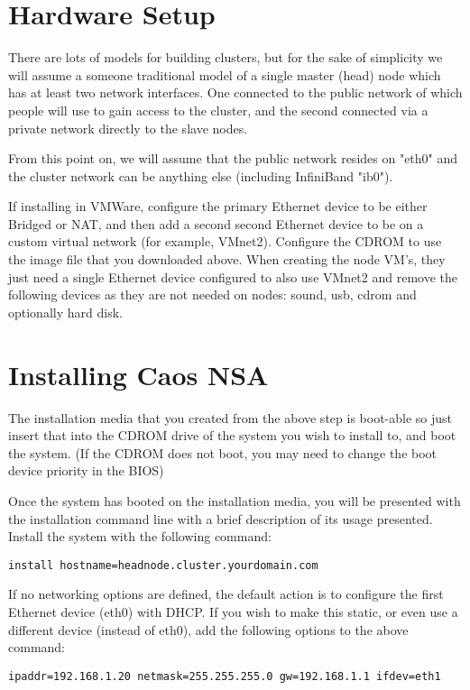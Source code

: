 \documentclass[10pt,letterpaper]{article}
\begin{document}
\section{Hardware Setup}
There are lots of models for building clusters, but for the sake of
simplicity we will assume a someone traditional model of a single master
(head) node which has at least two network interfaces. One connected to the
public network of which people will use to gain access to the cluster, and
the second connected via a private network directly to the slave nodes.

From this point on, we will assume that the public network resides on "eth0"
and the cluster network can be anything else (including InfiniBand "ib0").

If installing in VMWare, configure the primary Ethernet device to be either
Bridged or NAT, and then add a second second Ethernet device to be on a custom
virtual network (for example, VMnet2). Configure the CDROM to use the image
file that you downloaded above. When creating the node VM's, they just need
a single Ethernet device configured to also use VMnet2 and remove the following
devices as they are not needed on nodes: sound, usb, cdrom and optionally hard
disk.

\section{Installing Caos NSA}
The installation media that you created from the above step is boot-able
so just insert that into the CDROM drive of the system you wish to install
to, and boot the system. (If the CDROM does not boot, you may need to change
the boot device priority in the BIOS)

Once the system has booted on the installation media, you will be presented
with the installation command line with a brief description of its usage
presented. Install the system with the following command:

\begin{verbatim}
install hostname=headnode.cluster.yourdomain.com
\end{verbatim}

If no networking options are defined, the default action is to configure the
first Ethernet device (eth0) with DHCP. If you wish to make this static, or
even use a different device (instead of eth0), add the following options to
the above command:

\begin{verbatim}
ipaddr=192.168.1.20 netmask=255.255.255.0 gw=192.168.1.1 ifdev=eth1
\end{verbatim}
\end{document}
